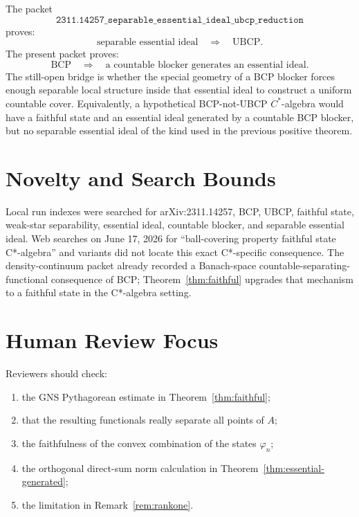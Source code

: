 \documentclass[11pt]{article}
\begin{document}
The packet
\[
\texttt{2311.14257\_separable\_essential\_ideal\_ubcp\_reduction}
\]
proves:
\[
        \text{separable essential ideal}
        \quad\Longrightarrow\quad
        \text{UBCP}.
\]
The present packet proves:
\[
        \text{BCP}
        \quad\Longrightarrow\quad
        \text{a countable blocker generates an essential ideal}.
\]
The still-open bridge is whether the special geometry of a BCP blocker forces
enough separable local structure inside that essential ideal to construct a
uniform countable cover.  Equivalently, a hypothetical BCP-not-UBCP
\(C^*\)-algebra would have a faithful state and an essential ideal generated
by a countable BCP blocker, but no separable essential ideal of the kind used
in the previous positive theorem.

\section*{Novelty and Search Bounds}

Local run indexes were searched for arXiv:2311.14257, BCP, UBCP, faithful
state, weak-star separability, essential ideal, countable blocker, and
separable essential ideal.  Web searches on June 17, 2026 for
``ball-covering property faithful state C*-algebra'' and variants did not
locate this exact C*-specific consequence.  The density-continuum packet
already recorded a Banach-space countable-separating-functional consequence
of BCP; Theorem~\ref{thm:faithful} upgrades that mechanism to a faithful state
in the C*-algebra setting.

\section*{Human Review Focus}

Reviewers should check:
\begin{enumerate}
    \item the GNS Pythagorean estimate in Theorem~\ref{thm:faithful};
    \item that the resulting functionals really separate all points of \(A\);
    \item the faithfulness of the convex combination of the states
          \(\varphi_n\);
    \item the orthogonal direct-sum norm calculation in
          Theorem~\ref{thm:essential-generated};
    \item the limitation in Remark~\ref{rem:rankone}.
\end{enumerate}
\end{document}
